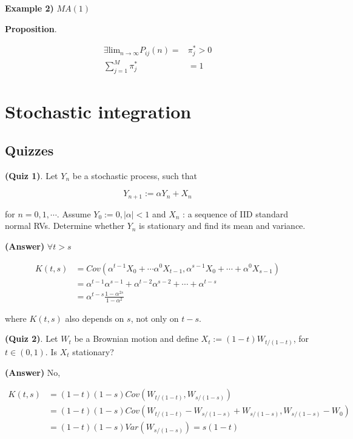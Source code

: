\documentclass[12pt]{article}
\theoremstyle{nonumberbreak}
\begin{document}
\textbf{Example 2)} $MA(1)$



\begin{theorem}
\textbf{Proposition}. 

$$
\begin{aligned}
\exists \mathrm{lim}_{n\to\infty} P_{ij}(n) =& \pi_j^\ast > 0 \\[8pt]
\sum_{j=1}^M \pi_j^\ast &= 1
\end{aligned}
$$

\end{theorem}





\section{Stochastic integration}



\subsection*{Quizzes}

\textbf{(Quiz 1)}. Let $Y_n$ be a stochastic process, such that

$$
Y_{n+1} := \alpha Y_n + X_n
$$

for $n=0, 1, \cdots$. Assume $Y_0 := 0, |\alpha| < 1$ and $X_n$ : a sequence of IID standard normal RVs. Determine whether $Y_n$ is stationary and find its mean and variance.


\textbf{(Answer)} $\forall t > s$

$$
\begin{aligned}
K(t,s) &= Cov(\alpha^{t-1} X_0 + \cdots \alpha^0 X_{t-1}, \alpha^{s-1} X_0 + \cdots + \alpha^0 X_{s-1}) \\[8pt]
&= \alpha^{t-1} \alpha^{s-1} + \alpha^{t-2} \alpha^{s-2} + \cdots + \alpha^{t-s} \\[8pt]
&= \alpha^{t-s} \frac{1-\alpha^{2s}}{1-\alpha^2}
\end{aligned}
$$

where $K(t,s)$ also depends on $s$, not only on $t-s$.




\textbf{(Quiz 2)}. Let $W_t$ be a Brownian motion and define $X_t := (1-t) W_{t/(1-t)}$, for $t \in (0,1)$. Is $X_t$ stationary? 

\textbf{(Answer)} No,

$$
\begin{aligned}
K(t,s) &= (1-t)(1-s) Cov(W_{t/(1-t)}, W_{s/(1-s)}) \\[8pt]
&= (1-t)(1-s) Cov(W_{t/(1-t)} - W_{s/(1-s)} + W_{s/(1-s)}, W_{s/(1-s)} - W_0) \\[8pt]
&= (1-t)(1-s) Var(W_{s/(1-s)}) = s(1-t)
\end{aligned}
$$
\end{document}

